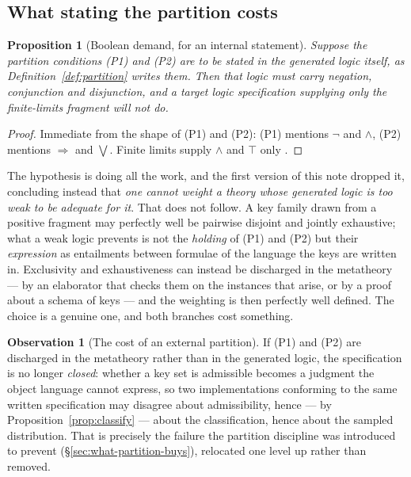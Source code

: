 \documentclass[11pt,a4paper]{article}
\theoremstyle{plain}
\newtheorem{proposition}[theorem]{Proposition}
\theoremstyle{definition}
\newtheorem{observation}[theorem]{Observation}
\theoremstyle{remark}
\begin{document}
\subsection{What stating the partition costs}
\label{sec:boolean}

\begin{proposition}[Boolean demand, for an internal statement]
\label{prop:boolean}
Suppose the partition conditions (P1) and (P2) are to be stated \emph{in the generated logic itself},
as Definition~\ref{def:partition} writes them. Then that logic must carry negation, conjunction and
disjunction, and a target logic specification supplying only the finite-limits fragment will not do.
\end{proposition}

\begin{proof}
Immediate from the shape of (P1) and (P2): (P1) mentions $\neg$ and $\wedge$, (P2) mentions
$\Rightarrow$ and $\bigvee$. Finite limits supply $\wedge$ and $\top$ only \cite{omnibus}.
\end{proof}

The hypothesis is doing all the work, and the first version of this note dropped it, concluding
instead that \emph{one cannot weight a theory whose generated logic is too weak to be adequate for
it}. That does not follow. A key family drawn from a positive fragment may perfectly well be
pairwise disjoint and jointly exhaustive; what a weak logic prevents is not the \emph{holding} of
(P1) and (P2) but their \emph{expression} as entailments between formulae of the language the keys
are written in. Exclusivity and exhaustiveness can instead be discharged in the metatheory --- by an
elaborator that checks them on the instances that arise, or by a proof about a schema of keys --- and
the weighting is then perfectly well defined. The choice is a genuine one, and both branches cost
something.

\begin{observation}[The cost of an external partition]
\label{obs:closure}
If (P1) and (P2) are discharged in the metatheory rather than in the generated logic, the
specification is no longer \emph{closed}: whether a key set is admissible becomes a judgment the
object language cannot express, so two implementations conforming to the same written specification
may disagree about admissibility, hence --- by Proposition~\ref{prop:classify} --- about the
classification, hence about the sampled distribution. That is precisely the failure the partition
discipline was introduced to prevent (\S\ref{sec:what-partition-buys}), relocated one level up
rather than removed.
\end{observation}
\end{document}
